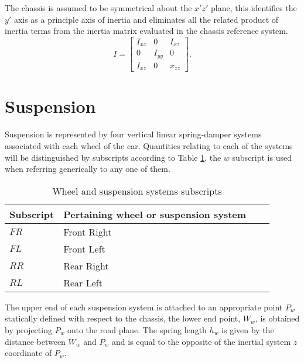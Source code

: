 The chassis is assumed to be symmetrical about the $x'z'$ plane, this identifies the $y'$ axis as a principle axis of inertia and eliminates all the related product of inertia terms from the inertia matrix evaluated in the chassis reference system.
$$
I = \begin{bmatrix}
I_{xx} & 0      & I_{xz}\\
0      & I_{yy} & 0     \\
I_{xz} & 0      & x_{zz}
\end{bmatrix}.
$$



\section{Suspension}
\label{sec:suspension}
Suspension is represented by four vertical linear spring-damper systems associated with each wheel of the car. Quantities relating to each of the systems will be distinguished by subscripts according to Table \ref{table:subscripts}, the $w$ subscript is used when referring generically to any one of them.

\begin{table}[ht]
  \caption{Wheel and suspension systems subscripts} %
  \centering %
  \begin{tabular}{l l l l} %
    \hline\hline %
    Subscript & Pertaining wheel or suspension system \\ [0.5ex] %
    \hline %
    $FR$ & Front Right \\ %
    $FL$ & Front Left \\
    $RR$ & Rear Right \\
    $RL$ & Rear Left \\ [1ex] %
    \hline %
  \end{tabular}
  \label{table:subscripts} %
\end{table}

The upper end of each suspension system is attached to an appropriate point $P_w$ statically defined with respect to the chassis, the lower end point, $W_w$, is obtained by projecting $P_w$ onto the road plane.
The spring length $h_w$ is given by the distance between $W_w$ and $P_w$ and is equal to the opposite of the inertial system $z$ coordinate of $P_w$.

